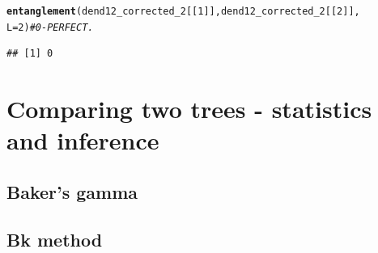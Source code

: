 \documentclass[shortnames,nojss,article]{jss}\usepackage[]{graphicx}\usepackage[]{color}
\makeatletter
\newcommand{\hlnum}[1]{\textcolor[rgb]{0.686,0.059,0.569}{#1}}%
\newcommand{\hlcom}[1]{\textcolor[rgb]{0.678,0.584,0.686}{\textit{#1}}}%
\newcommand{\hlstd}[1]{\textcolor[rgb]{0.345,0.345,0.345}{#1}}%
\newcommand{\hlkwc}[1]{\textcolor[rgb]{0.333,0.667,0.333}{#1}}%
\newcommand{\hlkwd}[1]{\textcolor[rgb]{0.737,0.353,0.396}{\textbf{#1}}}%
\newenvironment{kframe}{%
 \def\at@end@of@kframe{}%
 \ifinner\ifhmode%
  \def\at@end@of@kframe{\end{minipage}}%
  \begin{minipage}{\columnwidth}%
 \fi\fi%
 \def\FrameCommand##1{\hskip\@totalleftmargin \hskip-\fboxsep
 \colorbox{shadecolor}{##1}\hskip-\fboxsep
     \hskip-\linewidth \hskip-\@totalleftmargin \hskip\columnwidth}%
 \MakeFramed {\advance\hsize-\width
   \@totalleftmargin\z@ \linewidth\hsize
   \@setminipage}}%
 {\par\unskip\endMakeFramed%
 \at@end@of@kframe}
\newenvironment{knitrout}{}{} %
\makeatother
\begin{document}
\begin{knitrout}
{}


\begin{kframe}\begin{alltt}
\hlkwd{entanglement}\hlstd{(dend12_corrected_2[[}\hlnum{1}\hlstd{]], dend12_corrected_2[[}\hlnum{2}\hlstd{]],}
    \hlkwc{L} \hlstd{=} \hlnum{2}\hlstd{)}  \hlcom{# 0 - PERFECT.}
\end{alltt}
\begin{verbatim}
## [1] 0
\end{verbatim}
\begin{alltt}

\end{alltt}
\end{kframe}
\end{knitrout}






\section{Comparing two trees - statistics and inference}

\subsection{Baker's gamma}

\subsection{Bk method}














% 
% 
% 
% 
% 
%   
%   
% 
% 
\end{document}

